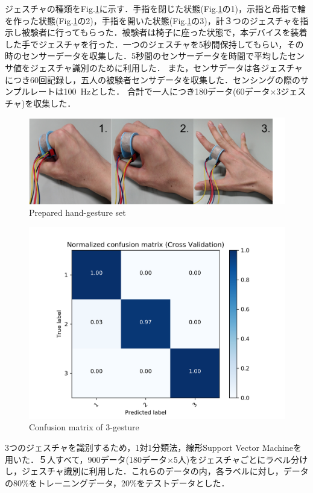 \documentclass{jarticle}
\begin{document}
ジェスチャの種類をFig.\ref{fig:gesture}に示す．手指を閉じた状態(Fig.\ref{fig:gesture}の1)，示指と母指で輪を作った状態(Fig.\ref{fig:gesture}の2)，手指を開いた状態(Fig.\ref{fig:gesture}の3)，計３つのジェスチャを指示し被験者に行ってもらった．被験者は椅子に座った状態で，本デバイスを装着した手でジェスチャを行った．一つのジェスチャを5秒間保持してもらい，その時のセンサーデータを収集した．5秒間のセンサーデータを時間で平均したセンサ値をジェスチャ識別のために利用した．
また，センサデータは各ジェスチャにつき60回記録し，五人の被験者センサデータを収集した．センシングの際のサンプルレートは100\ Hzとした．
合計で一人につき180データ(60データ$\times$3ジェスチャ)を収集した．


\begin{figure}[h]
  \centering
  \includegraphics[width=0.8\linewidth]{fig/gesture}
  \caption{Prepared hand-gesture set}
  \label{fig:gesture}
\end{figure}

\begin{figure}[h]
  \centering
  \includegraphics[width=1.0\linewidth]{fig/confusion_matrix}
  \caption{Confusion matrix of 3-gesture}
  \label{fig:matrix}
\end{figure}

3つのジェスチャを識別するため，1対1分類法，線形Support Vector Machineを用いた．５人すべて，900データ(180データ$\times$5人)をジェスチャごとにラベル分けし，ジェスチャ識別に利用した．これらのデータの内，各ラベルに対し，データの80\%をトレーニングデータ，20\%をテストデータとした．
\end{document}
